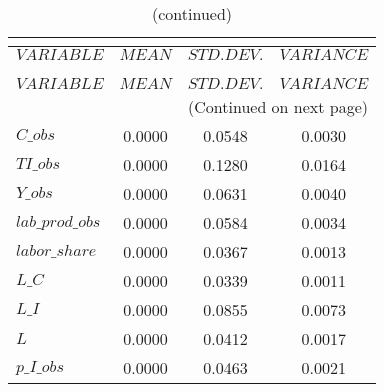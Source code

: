 
\begin{center}
\begin{longtable}{lccc} 
\caption{THEORETICAL MOMENTS}\\
 \label{Table:th_moments}\\
\toprule 
$VARIABLE        $	 & 	 $         MEAN$	 & 	 $    STD. DEV.$	 & 	 $     VARIANCE$\\
\midrule \endfirsthead 
\caption{(continued)}\\
 \toprule \\ 
$VARIABLE        $	 & 	 $         MEAN$	 & 	 $    STD. DEV.$	 & 	 $     VARIANCE$\\
\midrule \endhead 
\midrule \multicolumn{4}{r}{(Continued on next page)} \\ \bottomrule \endfoot 
\bottomrule \endlastfoot 
$C\_obs          $	 & 	       0.0000	 & 	       0.0548	 & 	       0.0030 \\ 
$TI\_obs         $	 & 	       0.0000	 & 	       0.1280	 & 	       0.0164 \\ 
$Y\_obs          $	 & 	       0.0000	 & 	       0.0631	 & 	       0.0040 \\ 
$lab\_prod\_obs  $	 & 	       0.0000	 & 	       0.0584	 & 	       0.0034 \\ 
$labor\_share    $	 & 	       0.0000	 & 	       0.0367	 & 	       0.0013 \\ 
$L\_C            $	 & 	       0.0000	 & 	       0.0339	 & 	       0.0011 \\ 
$L\_I            $	 & 	       0.0000	 & 	       0.0855	 & 	       0.0073 \\ 
$L               $	 & 	       0.0000	 & 	       0.0412	 & 	       0.0017 \\ 
$p\_I\_obs       $	 & 	       0.0000	 & 	       0.0463	 & 	       0.0021 \\ 
\end{longtable}
 \end{center}
